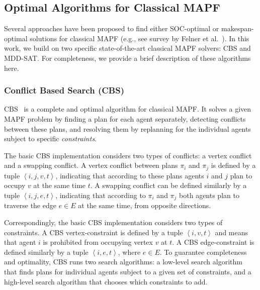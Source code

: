 \documentclass[review]{elsarticle}
\newcommand{\tuple}[1]{\ensuremath{\left \langle #1 \right \rangle }}
\newcommand\roni[1]{\nb{\textbf{Roni:}}{green}{#1}}
\newcommand\dor[1]{\nb{\textbf{Dor:}}{Fuchsia}{#1}}
\newcommand{\cbs}{\ac{CBS}\xspace}
\newcommand{\mapf}{\ac{MAPF}\xspace}
\begin{document}
\subsection{Optimal Algorithms for Classical \mapf}
Several approaches have been proposed to find either SOC-optimal or makespan-optimal solutions for classical \mapf 
(e.g., see survey by Felner et al.~\cite{felner2017searchBased}). 
In this work, we build on two specific state-of-the-art classical \mapf solvers: \cbs and MDD-SAT. 
For completeness, we provide a brief description of these algorithms here. 

\subsubsection{Conflict Based Search (CBS)}
\label{sec:cbs}

\cbs~\cite{sharon2015conflict} is a complete and optimal algorithm for classical \mapf. 
It solves a given \mapf problem by finding a plan for each agent separately, detecting conflicts between these plans, and resolving them by replanning for the individual agents subject to specific \emph{constraints}. 

The basic \cbs implementation considers two types of conflicts: a vertex conflict and a swapping conflict. A vertex conflict between plans $\pi_i$ and $\pi_j$ is defined by a tuple $\tuple{i,j,v,t}$, indicating that according to these plans agents $i$ and $j$ plan to occupy $v$ at the same time $t$. A swapping conflict can be defined similarly by a tuple $\tuple{i,j,e,t}$, indicating that according to $\pi_i$ and $\pi_j$ both agents plan to traverse the edge $e\in E$ at the same time, from opposite directions. 

Correspondingly, the basic \cbs implementation considers two types of constraints. 
A \cbs vertex-constraint is defined by a tuple $\tuple{i,v,t}$ and means that agent $i$ is prohibited from occupying vertex $v$ at $t$.  
A \cbs edge-constraint is defined similarly by a tuple $\tuple{i,e,t}$, where $e\in E$. To guarantee completeness and optimality, \cbs runs two search algorithms: a low-level search algorithm that finds plans for individual agents subject to a given set of constraints, and a high-level search algorithm that chooses which constraints to add. 
\end{document}

